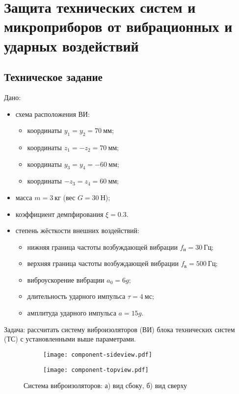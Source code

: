 \chapter{Защита технических систем и микроприборов от вибрационных и ударных воздействий}

\section{Техническое задание}

Дано:
\begin{itemize}
    \item схема расположения ВИ:
        \begin{itemize}
            \item координаты $y_1  = y_2  = 70~мм$;
            \item координаты $z_1  = -z_2 = 70~мм$;
            \item координаты $y_3  = y_4  = -60~мм$;
            \item координаты $-z_3 = z_4  = 60~мм$;
        \end{itemize}
    \item масса $m = 3~кг$ (вес $G = 30~Н$);
    \item коэффициент демпфирования $\xi = 0.3$.
    \item степень жёсткости внешних воздействий:
        \begin{itemize}
            \item нижняя граница частоты возбуждающей вибрации $f_{н} = 30~Гц$;
            \item верхняя граница частоты возбуждающей вибрации $f_{в} = 500~Гц$;
            \item виброускорение вибрации $a_0 = 6g$;
            \item длительность ударного импульса $\tau = 4~мс$;
            \item амплитуда ударного импульса $a = 15g$.
        \end{itemize}
\end{itemize}

Задача: рассчитать систему виброизоляторов (ВИ) блока технических систем (ТС) с установленными выше параметрами.

\begin{figure}[!h]
    \centering
    \begin{subfigure}[t]{0.5\textwidth}
        \centering
        \texttt{[image: component-sideview.pdf]}
        \caption{}
    \end{subfigure}
    \begin{subfigure}[t]{0.5\textwidth}
        \centering
        \texttt{[image: component-topview.pdf]}
        \caption{}
    \end{subfigure}
    \caption{Система виброизоляторов: а) вид сбоку, б) вид сверху}
\end{figure}

